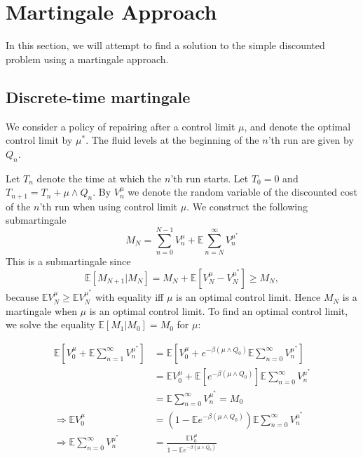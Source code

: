 


\chapter{Martingale Approach}
In this section, we will attempt to find a solution to the simple discounted problem using a martingale approach.

\section{Discrete-time martingale}
We consider a policy of repairing after a control limit $\mu$, and denote the optimal control limit by $\mu^*$.
The fluid levels at the beginning of the $n$'th run are given by $Q_n$.

Let $T_n$ denote the time at which the $n$'th run starts.
Let $T_0=0$ and $T_{n+1}=T_n+\mu\wedge Q_n$.
By $V_n^\mu$ we denote the random variable of the discounted cost of the $n$'th run when using control limit $\mu$.
We construct the following submartingale
$$
M_N=\sum\limits_{n=0}^{N-1}V_n^\mu+\mathbb{E}\sum\limits_{n=N}^\infty V_n^{\mu^*}
$$
This is a submartingale since
$$
\mathbb{E}[M_{N+1}|M_N]=M_N+\mathbb{E}[V_N^\mu-V_N^{\mu^*}]\geq M_N,
$$
because $\mathbb{E}V_N^\mu\geq \mathbb{E}V_N^{\mu^*}$ with equality iff $\mu$ is an optimal control limit.
Hence $M_N$ is a martingale when $\mu$ is an optimal control limit.
To find an optimal control limit, we solve the equality $\mathbb{E}[M_{1}|M_0]=M_0$ for $\mu$:

\begin{equation}\begin{split}
\mathbb{E}[V_0^\mu+\mathbb{E}\sum\limits_{n=1}^\infty V_n^{\mu^*}]
&=\mathbb{E}[V_0^\mu+e^{-\beta(\mu\wedge Q_0)}\mathbb{E}\sum\limits_{n=0}^\infty V_n^{\mu^*}]\\
&=\mathbb{E}V_0^\mu+\mathbb{E}[e^{-\beta(\mu\wedge Q_0)}]\mathbb{E}\sum\limits_{n=0}^\infty V_n^{\mu^*}\\
&=\mathbb{E}\sum\limits_{n=0}^\infty V_n^{\mu^*}=M_0\\
\Rightarrow \mathbb{E}V_0^\mu&=(1-\mathbb{E}e^{-\beta(\mu\wedge Q_0)})\mathbb{E}\sum\limits_{n=0}^\infty V_n^{\mu^*}\\
\Rightarrow \mathbb{E}\sum\limits_{n=0}^\infty V_n^{\mu^*}&=\frac{\mathbb{E}V_0^\mu}{1-\mathbb{E}e^{-\beta(\mu\wedge Q_0)}}
\end{split}
\end{equation}


